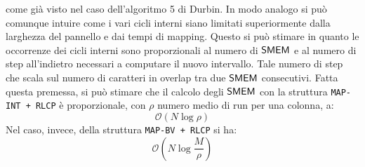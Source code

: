come già visto nel caso dell'algoritmo 5 di Durbin. In modo analogo si può
comunque intuire come i vari cicli interni siano limitati superiormente dalla
larghezza del pannello e dai tempi di mapping. Questo si può stimare in quanto
le occorrenze dei cicli interni sono proporzionali al numero di $\mbox{\rm {\sf SMEM}}$ e al
numero 
di step all'indietro necessari a computare il nuovo intervallo. Tale numero di
step che scala sul numero di caratteri in overlap tra due $\mbox{\rm {\sf SMEM}}$
consecutivi. Fatta questa premessa, si può stimare che il calcolo degli $\mbox{\rm {\sf SMEM}}$
con
la struttura \texttt{MAP-INT + RLCP} è proporzionale, con $\rho$ numero medio di
run per una colonna, a:
\begin{equation}
  \label{eq:lcpmatchint}
  \mathcal{O}(N\log \rho)
\end{equation}
Nel caso, invece, della struttura \texttt{MAP-BV + RLCP} si ha:
\begin{equation}
  \label{eq:lcpmatchbv}
  \mathcal{O}\left(N\log\frac{M}{\rho}\right)
\end{equation}

